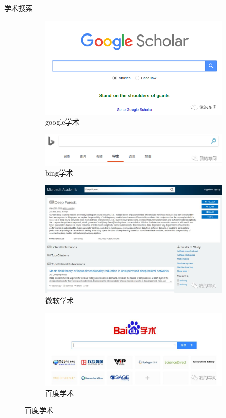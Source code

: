 \documentclass[presentation]{beamer}
\begin{document}
\begin{frame}{学术搜索}
    \begin{figure}
        \centering
        \begin{subfigure}{.5\textwidth}
              \centering
              \includegraphics[width=0.8\linewidth]{_0.png}
              \caption{google学术}
        \end{subfigure}%
        \begin{subfigure}{.5\textwidth}
              \centering
              \includegraphics[width=0.8\linewidth]{_1.png}
              \caption{bing学术}
        \end{subfigure}
        \begin{subfigure}{.5\textwidth}
              \centering
              \includegraphics[width=0.8\linewidth]{_3.png}
              \caption{微软学术}
        \end{subfigure}%
        \begin{subfigure}{.5\textwidth}
              \centering
              \includegraphics[width=0.8\linewidth]{_4.png}
              \caption{百度学术}
        \end{subfigure}
    \end{figure}
\end{frame}
\end{document}
